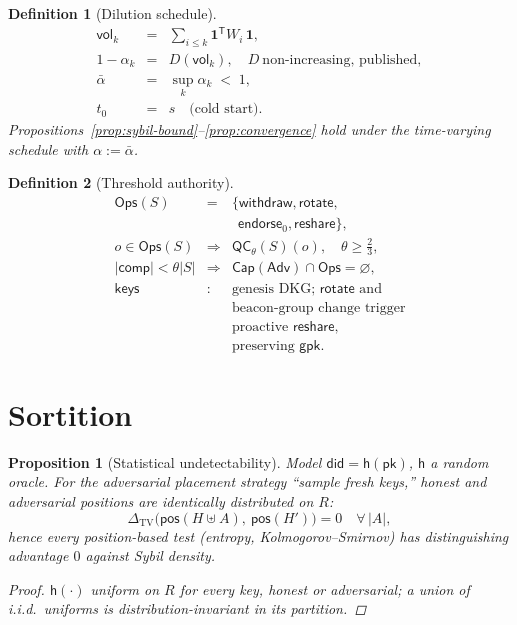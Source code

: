 \documentclass[11pt,letterpaper]{article}
\newtheorem{definition}{Definition}
\newtheorem{proposition}{Proposition}
\begin{document}
\begin{definition}[Dilution schedule]\label{def:dilution}
\[
\begin{array}{rcl}
\mathsf{vol}_k&=&\textstyle\sum_{i\leq k}\mathbf{1}^{\mathsf T}W_i\,\mathbf{1},\\
1-\alpha_k&=&D(\mathsf{vol}_k),\quad D\ \text{non-increasing, published},\\
\bar\alpha&=&\sup_k\alpha_k\;<\;1,\\
t_0&=&s\quad\text{(cold start)}.
\end{array}
\]
Propositions~\ref{prop:sybil-bound}--\ref{prop:convergence} hold under the
time-varying schedule with $\alpha:=\bar\alpha$.
\end{definition}

\begin{definition}[Threshold authority]\label{def:threshold}
\[
\begin{array}{rcl}
\mathsf{Ops}(S)&=&\{\mathsf{withdraw},\mathsf{rotate},\\
&&\ \ \mathsf{endorse}_0,\mathsf{reshare}\},\\
o\in\mathsf{Ops}(S)&\Rightarrow&\mathsf{QC}_{\theta}(S)(o),
  \quad\theta\geq\tfrac23,\\
|\mathsf{comp}|<\theta|S|&\Rightarrow&
  \mathsf{Cap}(\mathsf{Adv})\cap\mathsf{Ops}=\varnothing,\\
\mathsf{keys}&:&\text{genesis DKG; $\mathsf{rotate}$ and}\\
&&\text{beacon-group change trigger}\\
&&\text{proactive $\mathsf{reshare}$,}\\
&&\text{preserving $\mathsf{gpk}$}.
\end{array}
\]
\end{definition}

\section{Sortition}\label{sec:sampling}

\begin{proposition}[Statistical undetectability]\label{prop:stat}
Model $\mathsf{did}=\mathsf{h}(\mathsf{pk})$, $\mathsf{h}$ a random
oracle.  For the adversarial placement strategy ``sample fresh keys,''
honest and adversarial positions are identically distributed on $R$:
\[
\Delta_{\mathrm{TV}}\bigl(\mathsf{pos}(H\uplus A),\ \mathsf{pos}(H')\bigr)=0
\quad\forall\,|A|,
\]
hence every position-based test (entropy, Kolmogorov--Smirnov) has
distinguishing advantage $0$ against Sybil density.
\begin{proof}
$\mathsf{h}(\cdot)$ uniform on $R$ for every key, honest or adversarial; a
union of i.i.d.\ uniforms is distribution-invariant in its partition.
\end{proof}
\end{proposition}
\end{document}
